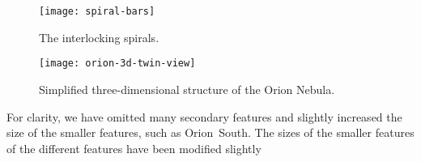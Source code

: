 \documentclass[iop, apj]{emulateapj}
\begin{document}
\begin{figure}
  \centering
  \texttt{[image: spiral-bars]}
  \caption{The interlocking spirals.}
  \label{fig:spiral-bars}
\end{figure}

\begin{figure*}
  \centering
  \texttt{[image: orion-3d-twin-view]}
  \caption{Simplified three-dimensional structure of the Orion Nebula.}
  \label{fig:3d-twin}
\end{figure*}

For clarity, we have omitted many secondary features and slightly increased the
size of the smaller features, such as Orion~South. 
The sizes of the smaller features  of the different features have been modified slightly



\end{document}
